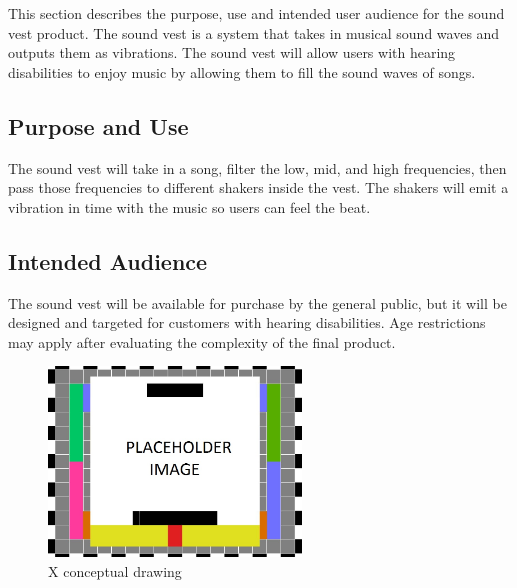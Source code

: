 This section describes the purpose, use and intended user audience for the sound vest product. The sound vest is a system that takes in musical sound waves and outputs them as vibrations. The sound vest will allow users with hearing disabilities to enjoy music by allowing them to fill the sound waves of songs.

\subsection{Purpose and Use}
The sound vest will take in a song, filter the low, mid, and high frequencies, then pass those frequencies to different shakers inside the vest. The shakers will emit a vibration in time with the music so users can feel the beat.

\subsection{Intended Audience}
The sound vest will be available for purchase by the general public, but it will be designed and targeted for customers with hearing disabilities. Age restrictions may apply after evaluating the complexity of the final product.

\begin{figure}[h!]
	\centering
   	\includegraphics[width=0.60\textwidth]{images/test_image}
    \caption{X conceptual drawing}
\end{figure}
